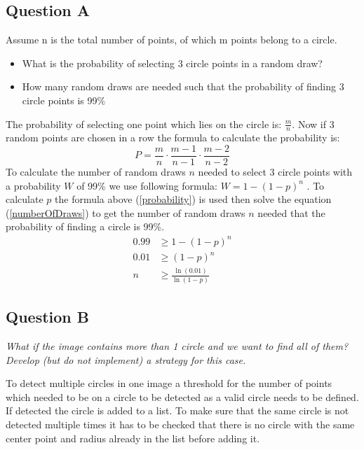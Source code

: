 \subsection{Question A}

\begin{itshape}
Assume n is the total number of points, of which m points belong to a circle.

\begin{itemize}
	\item What is the probability of selecting 3 circle points in a random draw?
	\item How many random draws are needed such that the probability of finding 3 circle
	points is 99\%
\end{itemize}
\end{itshape}

\vspace{3mm}

The probability of selecting one point which lies on the circle is: $\frac{m}{n}$. Now if 3 random points are chosen in a row the formula to calculate the probability is:
\begin{equation}
	P = \frac{m}{n} \cdot \frac{m-1}{n-1} \cdot \frac{m-2}{n-2}
	\label{probability}
\end{equation}
To calculate the number of random draws $n$ needed to select 3 circle points with a probability $W$ of 99\% we use following formula: $W = 1-(1-p)^n$ \cite{DanielaEder2020}. To calculate $p$ the formula above (\ref{probability}) is used then solve the equation (\ref{numberOfDraws}) to get the number of random draws $n$ needed that the probability of finding a circle is 99\%.
\begin{align}
	0.99& \geq 1 - (1-p)^n\\
	0.01& \geq (1-p)^n\\
	n& \geq \frac{\ln(0.01)}{\ln(1-p)}
	\label{numberOfDraws}
\end{align}

\subsection{Question B}

\textit{What if the image contains more than 1 circle and we want to find all of them? Develop (but do not implement)  a strategy for this case.}

\vspace{3mm}

To detect multiple circles in one image a threshold for the number of points which needed to be on a circle to be detected as a valid circle needs to be defined. If detected the circle is added to a list. To make sure that the same circle is not detected multiple times it has to be checked that there is no circle with the same center point and radius already in the list before adding it.